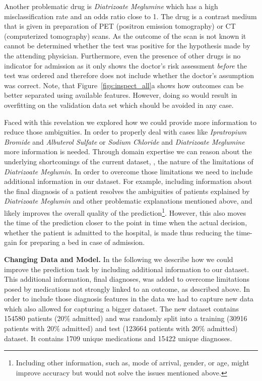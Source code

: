 Another problematic drug is \emph{Diatrizoate Meglumine} which has a high misclassification rate and an odds ratio close to 1.
The drug is a contrast medium that is given in preparation of PET (positron emission tomography) or CT (computerized tomography) scans.
As the outcome of the scan is not known it cannot be determined whether the test was positive for the hypothesis made by the attending physician.
Furthermore, even the presence of other drugs is no indicator for admission as it only shows the doctor's risk assessment \textit{before} the test was ordered and therefore does not include whether the doctor's assumption was correct.
Note, that Figure~\ref{figs:inspect_all}a shows how outcomes can be better separated using available features.
However, doing so would result in overfitting on the validation data set which should be avoided in any case.

Faced with this revelation we explored how we could provide more information to reduce those ambiguities.
In order to properly deal with cases like \emph{Ipratropium Bromide} and \emph{Albuterol Sulfate} or \emph{Sodium Chloride} and \emph{Diatrizoate Meglumine} more information is needed.
Through domain expertise we can reason about the underlying shortcomings of the current dataset, \eg, the nature of the limitations of \emph{Diatrizoate Meglumin}.
In order to overcome those limitations we need to include additional information in our dataset.
For example, including information about the final diagnosis of a patient resolves the ambiguities of patients explained by \emph{Diatrizoate Meglumin} and other problematic explanations mentioned above, and likely improves the overall quality of the prediction\footnote{Including other information, such as, mode of arrival, gender, or age, might improve accuracy but would not solve the issues mentioned above.}.
However, this also moves the time of the prediction closer to the point in time when the actual decision, whether the patient is admitted to the hospital, is made thus reducing the time-gain for preparing a bed in case of admission.

\par \noindent \textbf{Changing Data and Model.}
In the following we describe how we could improve the prediction task by including additional information to our dataset. This additional information, \ie final diagnoses, was added to overcome limitations posed by medications not strongly linked to an outcome, as described above.
In order to include those diagnosis features in the data we had to capture new data which also allowed for capturing a bigger dataset.
The new dataset contains 154580 patients  ($20\%$ admitted) and was randomly split into a training (30916 patients with $20\%$ admitted) and test (123664 patients with $20\%$ admitted) dataset.
It contains 1709 unique medications and 15422 unique diagnoses.

